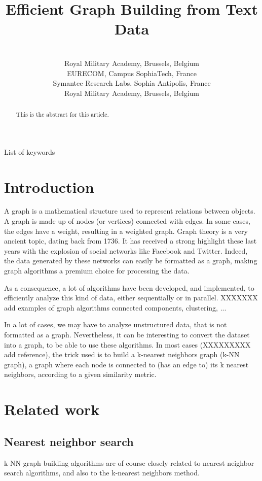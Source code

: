 \documentclass[wcp]{jmlr}
\title[Short Title]{Efficient Graph Building from Text Data}
\author{\Name{Thibault Debatty} \Email{thibault.debatty@rma.ac.be}\\
  \addr Royal Military Academy, Brussels, Belgium
  \AND
  \Name{Pietro Michiardi} \Email{pietro.michiardi@eurecom.fr}\\
  \addr EURECOM, Campus SophiaTech, France
  \AND
  \Name{Olivier Thonnard} \Email{olivier\_thonnard@symantec.com}\\
  \addr Symantec Research Labs, Sophia Antipolis, France
  \AND
  \Name{Wim Mees} \Email{wim.mees@rma.ac.be}\\
  \addr Royal Military Academy, Brussels, Belgium
 }
\begin{document}
\maketitle

\begin{abstract}
This is the abstract for this article.
\end{abstract}

\begin{keywords}
List of keywords
\end{keywords}

\section{Introduction}
A graph is a mathematical structure used to represent relations between objects. A graph is made up of nodes (or vertices) connected with edges. In some cases, the edges have a weight, resulting in a weighted graph. Graph theory is a very ancient topic, dating back from 1736. %
It has received a strong highlight these last years with the explosion of social networks like Facebook and Twitter. Indeed, the data generated by these networks can easily be formatted as a graph, making graph algorithms a premium choice for processing the data.

As a consequence, a lot of algorithms have been developed, and implemented, to efficiently analyze this kind of data, either sequentially or in parallel. XXXXXXX add examples of graph algorithms connected components, clustering, ...

In a lot of cases, we may have to analyze unstructured data, that is not formatted as a graph. Nevertheless, it can be interesting to convert the dataset into a graph, to be able to use these algorithms. In most cases (XXXXXXXXX add reference), the trick used is to build a k-nearest neighbors graph (k-NN graph), a graph where each node is connected to (has an edge to) its k nearest neighbors, according to a given similarity metric.

\section{Related work}

\subsection{Nearest neighbor search}
k-NN graph building algorithms are of course closely related to nearest neighbor search algorithms, and also to the k-nearest neighbors method.
\end{document}
